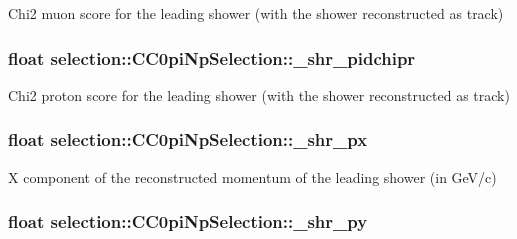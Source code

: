 Chi2 muon score for the leading shower (with the shower reconstructed as track) \hypertarget{classselection_1_1CC0piNpSelection_aae9294d7e4803ff991e611ea124769bc}{
\subsubsection[{\-\_\-shr\-\_\-pidchipr}]{\setlength{\rightskip}{0pt plus 5cm}float selection\-::\-C\-C0pi\-Np\-Selection\-::\-\_\-shr\-\_\-pidchipr\hspace{0.3cm}{\ttfamily [private]}}}\label{classselection_1_1CC0piNpSelection_aae9294d7e4803ff991e611ea124769bc}
Chi2 proton score for the leading shower (with the shower reconstructed as track) \hypertarget{classselection_1_1CC0piNpSelection_a52e2043c82f5de7f93ac9bad63563f18}{
\subsubsection[{\-\_\-shr\-\_\-px}]{\setlength{\rightskip}{0pt plus 5cm}float selection\-::\-C\-C0pi\-Np\-Selection\-::\-\_\-shr\-\_\-px\hspace{0.3cm}{\ttfamily [private]}}}\label{classselection_1_1CC0piNpSelection_a52e2043c82f5de7f93ac9bad63563f18}
X component of the reconstructed momentum of the leading shower (in Ge\-V/c) \hypertarget{classselection_1_1CC0piNpSelection_a436dd7081c84003dabb595289d745111}{
\subsubsection[{\-\_\-shr\-\_\-py}]{\setlength{\rightskip}{0pt plus 5cm}float selection\-::\-C\-C0pi\-Np\-Selection\-::\-\_\-shr\-\_\-py\hspace{0.3cm}{\ttfamily [private]}}}\label{classselection_1_1CC0piNpSelection_a436dd7081c84003dabb595289d745111}
